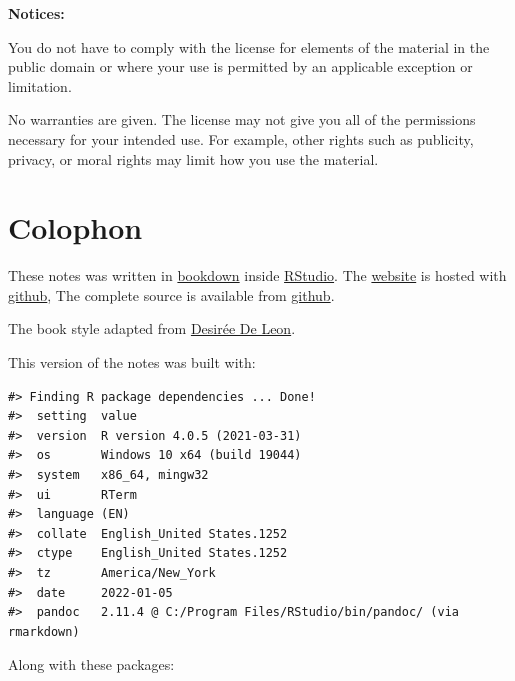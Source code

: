 \textbf{Notices:}

You do not have to comply with the license for elements of the
material in the public domain or where your use is permitted by an
applicable exception or limitation.

No warranties are given. The license may not give you all of the
permissions necessary for your intended use. For example, other rights
such as publicity, privacy, or moral rights may limit how you use the
material.

\hypertarget{colophon}{%
\chapter*{Colophon}\label{colophon}}


These notes was written in \href{http://bookdown.org/}{bookdown} inside \href{http://www.rstudio.com/ide/}{RStudio}. The \href{https://smasongarrison.github.io/syllabi}{website} is hosted with \href{https://www.github.com}{github}, The complete source is available from \href{https://github.com/smasongarrison/syllabi}{github}.

The book style adapted from \href{https://desiree.rbind.io/}{Desirée De Leon}.

This version of the notes was built with:

\begin{verbatim}
#> Finding R package dependencies ... Done!
#>  setting  value
#>  version  R version 4.0.5 (2021-03-31)
#>  os       Windows 10 x64 (build 19044)
#>  system   x86_64, mingw32
#>  ui       RTerm
#>  language (EN)
#>  collate  English_United States.1252
#>  ctype    English_United States.1252
#>  tz       America/New_York
#>  date     2022-01-05
#>  pandoc   2.11.4 @ C:/Program Files/RStudio/bin/pandoc/ (via rmarkdown)
\end{verbatim}

Along with these packages:

